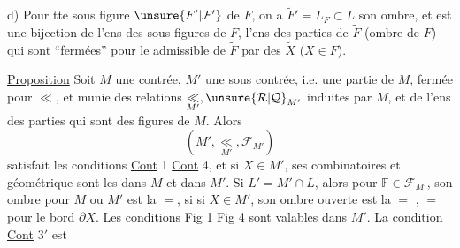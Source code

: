 d)  Pour tte sous figure $\unsure{F'|\mathcal F'}$ de $F$, on a  $\widetilde F'=L_F\subset L$ son ombre, et
est une bijection de l'ens des sous-figures de $F$,  l'ens des parties de $\widetilde F$ (ombre de $F$) qui sont ``fermées'' pour le  admissible de $\widetilde F$ par  des $\widetilde X$ ($X\in F$).

\uline{Proposition} Soit $M$ une contrée, $M'$ une sous contrée,  i.e. une partie de $M$, fermée pour $\ll$, et munie des relations $\underset{M'}{\ll},\unsure{\mathcal R|\mathcal Q}_{M'}$ induites par $M$, et de l'ens  des parties   qui sont des figures de $M$. Alors
\[
(M',\underset{M'}{\ll},\mathcal F_{M'})
\]
satisfait les conditions \uline{Cont} 1  \uline{Cont} 4, et si $X\in M'$, ses  combinatoires et géométrique sont les  dans $M$ et dans $M'$. Si $L'=M'\cap L$, alors pour  $\mathbb F\in\mathcal F_{M'}$, son ombre  pour $M$ ou $M'$ est la $=$, si si $X\in M'$,  son ombre ouverte est la $=$ ,  $=$ pour le bord $\partial X$. Les conditions Fig 1  Fig 4 sont valables dans $M'$. La condition \uline{Cont} $3'$  est
